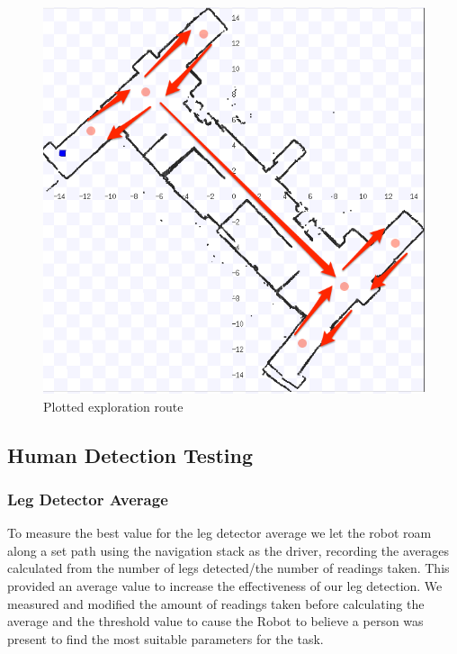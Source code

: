 \documentclass{article}
\begin{document}
\begin{multicols}{2}
          \begin{figure}[H]
	\begin{center}
              \includegraphics[width=0.8\linewidth]{ExperimentalResults10}
              \end{center}
              \caption{Plotted exploration route}
          \end{figure}
	
	\subsection{Human Detection Testing}
	\subsubsection{Leg Detector Average}
	To measure the best value for the leg detector average we let the robot roam along a set path using the navigation stack as the driver, recording the averages calculated from the number of legs detected/the number of readings taken. This provided an average value to increase the effectiveness of our leg detection. We measured and modified the amount of readings taken before calculating the average and the threshold value to cause the Robot to believe a person was present to find the most suitable parameters for the task.
	\end{multicols}
\end{document}
